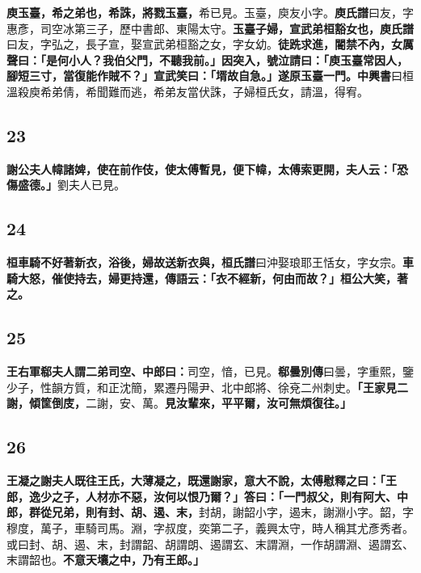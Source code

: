 \textbf{庾玉臺，希之弟也，希誅，將戮玉臺，}{\footnotesize 希已見。玉臺，庾友小字。\textbf{庾氏譜}曰友，字惠彥，司空冰第三子，歷中書郎、東陽太守。}\textbf{玉臺子婦，宣武弟桓豁女也，}{\footnotesize \textbf{庾氏譜}曰友，字弘之，長子宣，娶宣武弟桓豁之女，字女幼。}\textbf{徒跣求進，閽禁不內，女厲聲曰：「是何小人？我伯父門，不聽我前。」因突入，號泣請曰：「庾玉臺常因人，腳短三寸，當復能作賊不？」宣武笑曰：「壻故自急。」遂原玉臺一門。}{\footnotesize \textbf{中興書}曰桓溫殺庾希弟倩，希聞難而逃，希弟友當伏誅，子婦桓氏女，請溫，得宥。}

\subsection*{23}

\textbf{謝公夫人幃諸婢，使在前作伎，使太傅暫見，便下幃，太傅索更開，夫人云：「恐傷盛德。」}{\footnotesize 劉夫人已見。}

\subsection*{24}

\textbf{桓車騎不好著新衣，浴後，婦故送新衣與，}{\footnotesize \textbf{桓氏譜}曰沖娶琅耶王恬女，字女宗。}\textbf{車騎大怒，催使持去，婦更持還，傳語云：「衣不經新，何由而故？」桓公大笑，著之。}

\subsection*{25}

\textbf{王右軍郗夫人謂二弟司空、中郎曰：}{\footnotesize 司空，愔，已見。\textbf{郗曇別傳}曰曇，字重熙，鑒少子，性韻方質，和正沈簡，累遷丹陽尹、北中郎將、徐兗二州刺史。}\textbf{「王家見二謝，傾筐倒庋，}{\footnotesize 二謝，安、萬。}\textbf{見汝輩來，平平爾，汝可無煩復往。」}

\subsection*{26}

\textbf{王凝之謝夫人既往王氏，大薄凝之，既還謝家，意大不說，太傅慰釋之曰：「王郎，逸少之子，人材亦不惡，汝何以恨乃爾？」答曰：「一門叔父，則有阿大、中郎，群從兄弟，則有封、胡、遏、末，}{\footnotesize 封胡，謝韶小字，遏末，謝淵小字。韶，字穆度，萬子，車騎司馬。淵，字叔度，奕第二子，義興太守，時人稱其尤彥秀者。或曰封、胡、遏、末，封謂韶、胡謂朗、遏謂玄、末謂淵，一作胡謂淵、遏謂玄、末謂韶也。}\textbf{不意天壤之中，乃有王郎。」}

